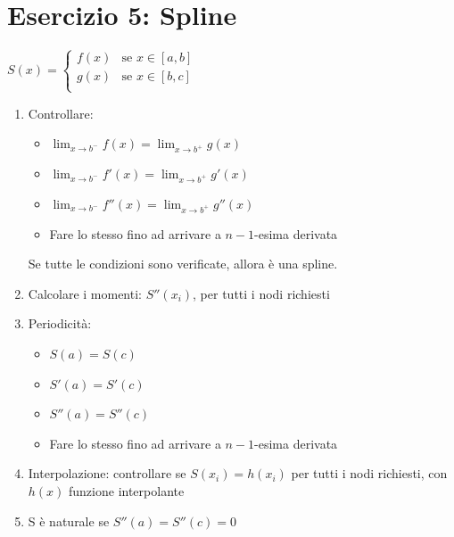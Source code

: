\documentclass[10pt]{article}
\begin{document}
\section{Esercizio 5: Spline}
$S(x)=\begin{cases}
    f(x) & \text{se } x\in [a,b]\\
    g(x) & \text{se } x\in [b,c]\\
\end{cases}$
\begin{enumerate}
    \item Controllare: \begin{itemize}
        \item $\lim_{x\to b^{-}} f(x) = \lim_{x\to b^{+}} g(x)$
        \item $\lim_{x\to b^{-}} f'(x) = \lim_{x\to b^{+}} g'(x)$
        \item $\lim_{x\to b^{-}} f''(x) = \lim_{x\to b^{+}} g''(x)$
        \item Fare lo stesso fino ad arrivare a $n-1$-esima derivata
    \end{itemize} Se tutte le condizioni sono verificate, allora è una spline.
    \item Calcolare i momenti: $S''(x_{i})$, per tutti i nodi richiesti 
    \item Periodicità: \begin{itemize}
        \item $S(a)=S(c)$
        \item $S'(a)=S'(c)$
        \item $S''(a)=S''(c)$
        \item Fare lo stesso fino ad arrivare a $n-1$-esima derivata
    \end{itemize}
    \item Interpolazione: controllare se $S(x_{i})=h(x_{i})$ per tutti i nodi richiesti, con $h(x)$ funzione interpolante
    \item S è naturale se $S''(a)=S''(c)=0$
\end{enumerate}
\end{document}
